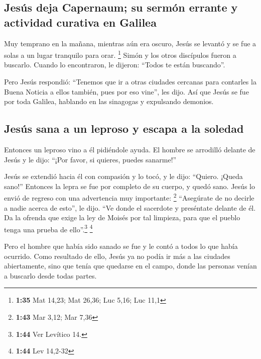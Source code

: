 \hypertarget{jesuxfas-deja-capernaum-su-sermuxf3n-errante-y-actividad-curativa-en-galilea}{%
\subsection{Jesús deja Capernaum; su sermón errante y actividad curativa
en
Galilea}\label{jesuxfas-deja-capernaum-su-sermuxf3n-errante-y-actividad-curativa-en-galilea}}

 Muy temprano en la mañana, mientras aún era oscuro,
Jesús se levantó y se fue a solas a un lugar tranquilo para orar.
\footnote{\textbf{1:35} Mat 14,23; Mat 26,36; Luc 5,16; Luc 11,1}
 Simón y los otros discípulos fueron a buscarlo.
 Cuando lo encontraron, le dijeron: ``Todos te están
buscando''.

 Pero Jesús respondió: ``Tenemos que ir a otras ciudades
cercanas para contarles la Buena Noticia a ellos también, pues por eso
vine'', les dijo.  Así que Jesús se fue por toda Galilea,
hablando en las sinagogas y expulsando demonios.

\hypertarget{jesuxfas-sana-a-un-leproso-y-escapa-a-la-soledad}{%
\subsection{Jesús sana a un leproso y escapa a la
soledad}\label{jesuxfas-sana-a-un-leproso-y-escapa-a-la-soledad}}

 Entonces un leproso vino a él pidiéndole ayuda. El
hombre se arrodilló delante de Jesús y le dijo: ``¡Por favor, si
quieres, puedes sanarme!''

 Jesús se extendió hacia él con compasión y lo tocó, y le
dijo: ``Quiero. ¡Queda sano!''  Entonces la lepra se fue
por completo de su cuerpo, y quedó sano.  Jesús lo envió
de regreso con una advertencia muy importante: \footnote{\textbf{1:43}
  Mar 3,12; Mar 7,36}  ``Asegúrate de no decirle a nadie
acerca de esto'', le dijo. ``Ve donde el sacerdote y preséntate delante
de él. Da la ofrenda que exige la ley de Moisés por tal limpieza, para
que el pueblo tenga una prueba de ello''.\footnote{\textbf{1:44} Ver
  Levítico 14.} \footnote{\textbf{1:44} Lev 14,2-32}

 Pero el hombre que había sido sanado se fue y le contó a
todos lo que había ocurrido. Como resultado de ello, Jesús ya no podía
ir más a las ciudades abiertamente, sino que tenía que quedarse en el
campo, donde las personas venían a buscarlo desde todas partes.

